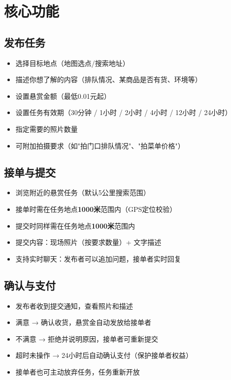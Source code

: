 \documentclass[12pt, a4paper]{article}
\begin{document}
\section{核心功能}

\subsection{发布任务}

\begin{itemize}[leftmargin=2em]
    \item 选择目标地点（地图选点/搜索地址）
    \item 描述你想了解的内容（排队情况、某商品是否有货、环境等）
    \item 设置悬赏金额（最低0.01元起）
    \item 设置任务有效期（30分钟 / 1小时 / 2小时 / 4小时 / 12小时 / 24小时）
    \item 指定需要的照片数量
    \item 可附加拍摄要求（如"拍门口排队情况"、"拍菜单价格"）
\end{itemize}

\subsection{接单与提交}

\begin{itemize}[leftmargin=2em]
    \item 浏览附近的悬赏任务（默认5公里搜索范围）
    \item 接单时需在任务地点\textbf{1000米}范围内（GPS定位校验）
    \item 提交时同样需在任务地点\textbf{1000米}范围内
    \item 提交内容：现场照片（按要求数量）+ 文字描述
    \item 支持实时聊天：发布者可以追加问题，接单者实时回复
\end{itemize}

\subsection{确认与支付}

\begin{itemize}[leftmargin=2em]
    \item 发布者收到提交通知，查看照片和描述
    \item 满意 → 确认收货，悬赏金自动发放给接单者
    \item 不满意 → 拒绝并说明原因，接单者可重新提交
    \item 超时未操作 → 24小时后自动确认支付（保护接单者权益）
    \item 接单者也可主动放弃任务，任务重新开放
\end{itemize}
\end{document}
